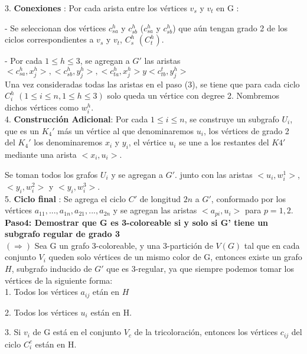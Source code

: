 \documentclass[
10pt, %
a4paper, %
oneside, %
headinclude,footinclude, %
BCOR5mm, %
]{scrartcl}
\begin{document}
3. \textbf{Conexiones} : Por cada arista entre los vértices $v_s$ y $v_t$ en G :

- Se seleccionan dos vértices $c_{sa}^{h}$ y $c_{sb}^{h}$ ($c_{sa}^{h}$ y $c_{sb}^{h}$) que aún tengan grado 2 de los ciclos correspondientes a $v_s$ y $v_t$, $C^h_s$ $(C^h_t)$.

- Por cada $1\leq h \leq 3$, se agregan a $G'$ las aristas $<c_{sa}^{h},x^h_j> , <c_{sb}^{h},y^h_j> , <c_{ta}^{h},x^h_j>  y <c_{tb}^{t}, y^h_j >$\\

Una vez consideradas todas las aristas en
el paso (3), se tiene que para cada ciclo $C^h_i$ $( 1\leq i \leq n, 1 \leq h \leq 3 )$ solo queda un vértice con degree 2. Nombremos
dichos vértices como $w^h_i$.\\

4. \textbf{Construcción Adicional}: Por cada $1 \leq i \leq n$, se construye un subgrafo $U_i$, que es un $K_4'$ más un vértice al que denominaremos $u_i$, los vértices de grado 2 del $K_4'$ los denominaremos 
$x_i$ y $y_i$, el vértice $u_i$ se une a los restantes del $K4'$ mediante una arista $<x_i, u_i>$. 

Se toman todos los grafos $U_i$ y se agregan a $G'$. junto con las aristas $<u_i,w^1_i>$, $<y_i, w^2_i>$ y $<y_i, w^3_i>$.\\


5. \textbf{Ciclo final} : Se agrega el ciclo $C'$ de longitud $2n$ a $G'$, conformado por los vértices ${a_{11},..., a_{1n}, a_{21},..., a_{2n}}$ y se agregan las aristas $<a_{pi}, u_i>$ para $p = 1,2$.\\


\textbf{Paso4: Demostrar que G es 3-coloreable si y solo si G' tiene un subgrafo regular de grado 3  }\\

$(\Rightarrow)$ Sea G un grafo 3-coloreable, y una 3-partición de $V(G)$ tal que en cada conjunto $V_i$ queden solo vértices de un mismo color de G, entonces existe un grafo $H$, 
subgrafo inducido de $G'$ que es 3-regular, ya que siempre podemos tomar los vértices de la siguiente forma:\\

1. Todos los vértices $a_{ij}$ etán en $H$

2. Todos los vértices $u_i$ est\'an en H.

3. Si $v_i$ de G est\'a en el conjunto $V_c$ de la tricoloraci\'on, entonces los v\'ertices $c_{ij}$ del ciclo $C^c_i$ est\'an en H.
\end{document}
